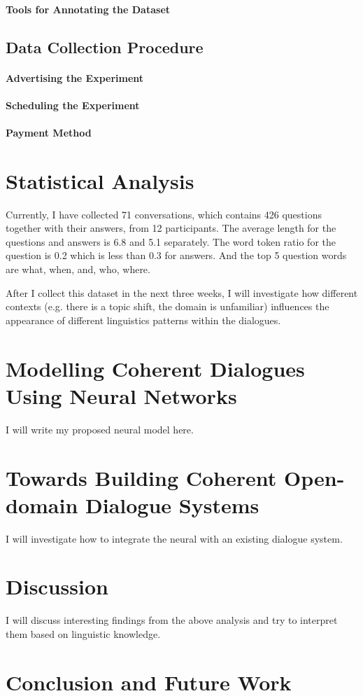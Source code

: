 \documentclass[bsc,frontabs,twoside,singlespacing,parskip,deptreport]{infthesis}     %
\begin{document}
\subsubsection*{Tools for Annotating the Dataset}

\section{Data Collection Procedure}
\subsubsection*{Advertising the Experiment}
\subsubsection*{Scheduling the Experiment}
\subsubsection*{Payment Method}

\chapter{Statistical Analysis}

Currently, I have collected 71 conversations, which contains 426 questions together with their answers, from 12 participants. The average length for the questions and answers is 6.8 and 5.1 separately. The word token ratio for the question is 0.2 which is less than 0.3 for answers. And the top 5 question words are what, when, and, who, where.

After I collect this dataset in the next three weeks, I will investigate how different contexts (e.g. there is a topic shift, the domain is unfamiliar) influences the appearance of different linguistics patterns within the dialogues.

\chapter{Modelling Coherent Dialogues Using Neural Networks}
I will write my proposed neural model here.

\chapter{Towards Building Coherent Open-domain Dialogue Systems}
I will investigate how to integrate the neural with an existing dialogue system. 

\chapter{Discussion}
I will discuss interesting findings from the above analysis and try to interpret them based on linguistic knowledge. 

\chapter{Conclusion and Future Work}



\end{document}
